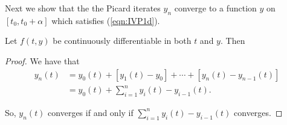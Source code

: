 \documentclass{article}
\begin{document}
Next we show that the the Picard iterates $y_n$ converge to a function $y$ on $[t_0, t_0 + \alpha]$ which satisfies (\ref{eqn:IVP1d}).

\begin{theorem}
    Let $f(t,y)$ be continuously differentiable in both $t$ and $y$.
    Then
\end{theorem}

\begin{proof}

We have that
\begin{align*}
    y_n(t)
    &=
    y_0(t) + [y_1(t)-y_0] + \cdots + [y_n(t)-y_{n-1}(t)] \\
    &=
    y_0(t)
    +
    \sum_{i=1}^n
    y_i(t)-y_{i-1}(t).
\end{align*}

So, $y_n(t)$ converges if and only if $\sum_{i=1}^n y_i(t)-y_{i-1}(t)$ converges.

\end{proof}
\end{document}
